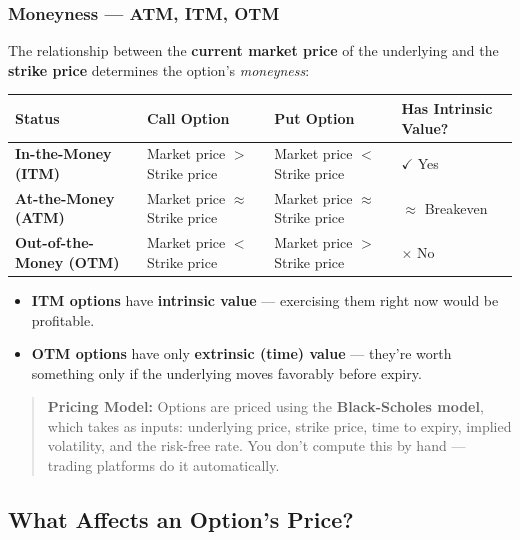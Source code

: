 \documentclass[12pt,openany]{book}
\begin{document}
\subsubsection{Moneyness — ATM, ITM, OTM}

The relationship between the \textbf{current market price} of the underlying and the \textbf{strike price} determines the option's \emph{moneyness}:

\begin{center}
\scriptsize
\setlength{\tabcolsep}{3pt}
\begin{tabular}{|L{3.0cm}|L{3.0cm}|L{3.0cm}|L{3.0cm}|}
\hline
\textbf{Status} & \textbf{Call Option} & \textbf{Put Option} & \textbf{Has Intrinsic Value?} \\
\hline
\textbf{In-the-Money (ITM)} & Market price \(>\) Strike price & Market price \(<\) Strike price & \(\checkmark\) Yes \\
\hline
\textbf{At-the-Money (ATM)} & Market price \(\approx\) Strike price & Market price \(\approx\) Strike price & \(\approx\) Breakeven \\
\hline
\textbf{Out-of-the-Money (OTM)} & Market price \(<\) Strike price & Market price \(>\) Strike price & \(\times\) No \\
\hline
\end{tabular}
\end{center}

\begin{itemize}[leftmargin=*]
    \item \textbf{ITM options} have \textbf{intrinsic value} — exercising them right now would be profitable.
    \item \textbf{OTM options} have only \textbf{extrinsic (time) value} — they're worth something only if the underlying moves favorably before expiry.
\end{itemize}

\begin{quote}
\textbf{Pricing Model:} Options are priced using the \textbf{Black-Scholes model}, which takes as inputs: underlying price, strike price, time to expiry, implied volatility, and the risk-free rate. You don't compute this by hand — trading platforms do it automatically.
\end{quote}

\subsection{What Affects an Option's Price?}
\end{document}
